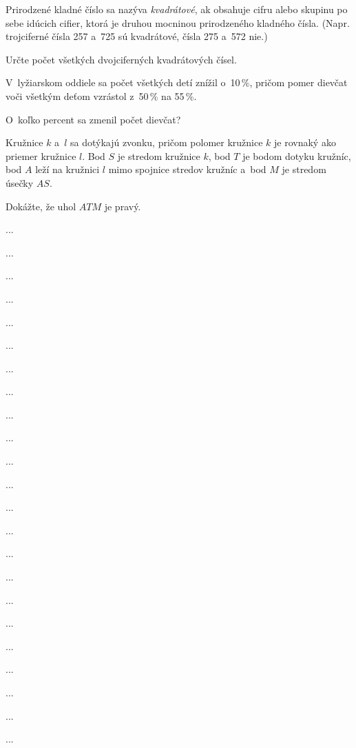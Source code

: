{%
Prirodzené kladné číslo sa nazýva {\it kvadrátové\/}, ak obsahuje cifru alebo skupinu po sebe idúcich cifier, ktorá je druhou mocninou prirodzeného kladného čísla.
(Napr. trojciferné čísla 257 a~725 sú kvadrátové, čísla 275 a~572 nie.)

Určte počet všetkých dvojciferných kvadrátových čísel.
}

{%
V~lyžiarskom oddiele sa počet všetkých detí znížil o~10\,\%, pričom pomer dievčat voči všetkým deťom vzrástol z~50\,\% na 55\,\%.

O~koľko percent sa zmenil počet dievčat?
}

{%
Kružnice $k$ a~$l$ sa dotýkajú zvonku, pričom polomer kružnice $k$ je rovnaký ako priemer kružnice $l$.
Bod $S$ je stredom kružnice $k$,
bod $T$ je bodom dotyku kružníc,
bod $A$ leží na kružnici $l$ mimo spojnice stredov kružníc
a~bod $M$ je stredom úsečky $AS$.

Dokážte, že uhol $ATM$ je pravý.
}


{%
...}

{%
...}

{%
...}

{%
...}

{%
...}

{%
...}

{%
...}

{%
...}

{%
...}

{%
...}

{%
...}

{%
...}

{%
...}

{%
...}

{%
...}

{%
...}

{%
...}

{%
...}

{%
...}

{%
...}

{%
...}

{%
...}

{%
...}

